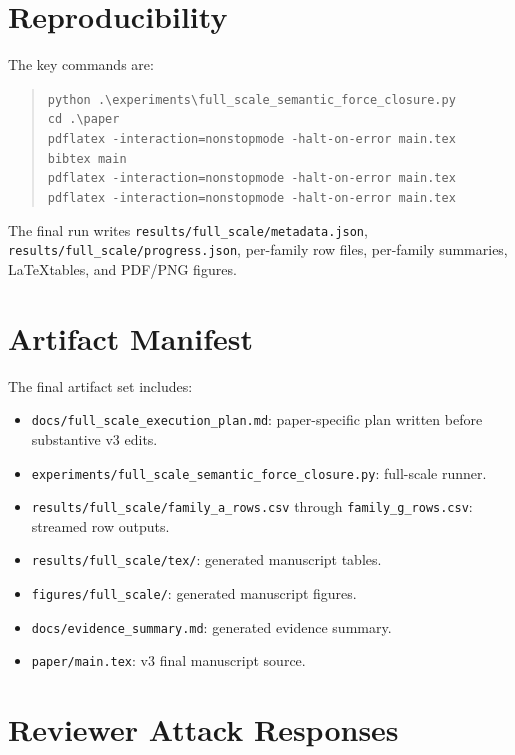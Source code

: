 \documentclass{article}
\begin{document}
\section{Reproducibility}

The key commands are:

\begin{quote}
\small
\texttt{python .\textbackslash experiments\textbackslash full\_scale\_semantic\_force\_closure.py}\\
\texttt{cd .\textbackslash paper}\\
\texttt{pdflatex -interaction=nonstopmode -halt-on-error main.tex}\\
\texttt{bibtex main}\\
\texttt{pdflatex -interaction=nonstopmode -halt-on-error main.tex}\\
\texttt{pdflatex -interaction=nonstopmode -halt-on-error main.tex}
\end{quote}

The final run writes \texttt{results/full\_scale/metadata.json}, \texttt{results/full\_scale/progress.json}, per-family row files, per-family summaries, \LaTeX tables, and PDF/PNG figures.

\section{Artifact Manifest}

The final artifact set includes:

\begin{itemize}
\item \texttt{docs/full\_scale\_execution\_plan.md}: paper-specific plan written before substantive v3 edits.
\item \texttt{experiments/full\_scale\_semantic\_force\_closure.py}: full-scale runner.
\item \texttt{results/full\_scale/family\_a\_rows.csv} through \texttt{family\_g\_rows.csv}: streamed row outputs.
\item \texttt{results/full\_scale/tex/}: generated manuscript tables.
\item \texttt{figures/full\_scale/}: generated manuscript figures.
\item \texttt{docs/evidence\_summary.md}: generated evidence summary.
\item \texttt{paper/main.tex}: v3 final manuscript source.
\end{itemize}

\section{Reviewer Attack Responses}
\end{document}
